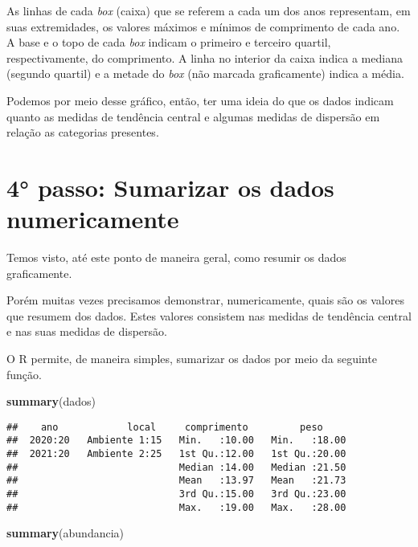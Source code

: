 \documentclass[14pt,titlepage, oneside, openany, a4paper]{book}
\newenvironment{Shaded}{\begin{snugshade}}{\end{snugshade}}
\newcommand{\KeywordTok}[1]{\textcolor[rgb]{0.13,0.29,0.53}{\textbf{#1}}}
\newcommand{\NormalTok}[1]{#1}
\begin{document}
As linhas de cada \emph{box} (caixa) que se referem a cada um dos anos representam, em suas extremidades, os valores máximos e mínimos de comprimento de cada ano. A base e o topo de cada \emph{box} indicam o primeiro e terceiro quartil, respectivamente, do comprimento. A linha no interior da caixa indica a mediana (segundo quartil) e a metade do \emph{box} (não marcada graficamente) indica a média.

Podemos por meio desse gráfico, então, ter uma ideia do que os dados indicam quanto as medidas de tendência central e algumas medidas de dispersão em relação as categorias presentes.

\hypertarget{passo-sumarizar-os-dados-numericamente}{%
\section{4° passo: Sumarizar os dados numericamente}\label{passo-sumarizar-os-dados-numericamente}}

Temos visto, até este ponto de maneira geral, como resumir os dados graficamente.

Porém muitas vezes precisamos demonstrar, numericamente, quais são os valores que resumem dos dados. Estes valores consistem nas medidas de tendência central e nas suas medidas de dispersão.

O R permite, de maneira simples, sumarizar os dados por meio da seguinte função.

\begin{Shaded}
\begin{Highlighting}[]
\KeywordTok{summary}\NormalTok{(dados)}
\end{Highlighting}
\end{Shaded}

\begin{verbatim}
##    ano            local     comprimento         peso      
##  2020:20   Ambiente 1:15   Min.   :10.00   Min.   :18.00  
##  2021:20   Ambiente 2:25   1st Qu.:12.00   1st Qu.:20.00  
##                            Median :14.00   Median :21.50  
##                            Mean   :13.97   Mean   :21.73  
##                            3rd Qu.:15.00   3rd Qu.:23.00  
##                            Max.   :19.00   Max.   :28.00
\end{verbatim}

\begin{Shaded}
\begin{Highlighting}[]
\KeywordTok{summary}\NormalTok{(abundancia)}
\end{Highlighting}
\end{Shaded}
\end{document}
